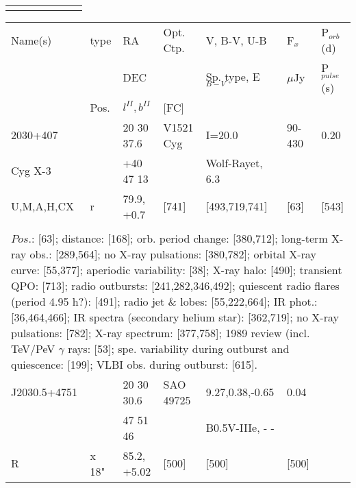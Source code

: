 \documentclass{aa}
\begin{document}
\begin{table*}[h]
\begin{tabular}{p{2.5cm}p{1cm}p{1.8cm}p{2.3cm}p{3.3cm}p{2.0cm}p{2.2cm}}
\noalign{\smallskip}
\hline
\end{tabular}
\end{table*}

\clearpage\begin{table*}[h]
\begin{tabular}{p{2.5cm}p{1cm}p{1.8cm}p{2.3cm}p{3.3cm}p{2.0cm}p{2.2cm}}
\noalign{\smallskip}
\multicolumn{7}{p{17.5cm}}{Table 1.  (continued) }\\        
\hline
\noalign{\smallskip}
Name(s)      & type  & RA                  &  Opt. Ctp. & V, B-V, U-B                    &   F$_{x}$           & P$_{orb}$(d)    \\
                      &            &  DEC              &                     &  Sp. type, E$_{B-V}$  &    $\mu$Jy        & P$_{pulse}$(s) \\
                      & Pos.  &  $l^{II}, b^{II}$     &  [FC]           &                                          &                            &                             \\
\noalign{\smallskip} 

\hline
\noalign{\smallskip}
2030+407     &           & 20 30 37.6       & V1521 Cyg         & I=20.0                       & 90-430             & 0.20          \\
Cyg X-3        &           & +40 47 13        &                               &  Wolf-Rayet, 6.3    &                          &                   \\
U,M,A,H,CX   & r        & 79.9, +0.7        & [741]                  &  [493,719,741]     & [63]                  & [543]         \\
\\
\multicolumn{7}{p{17.5cm}}{
$Pos$.: [63]; distance: [168]; orb. period change: [380,712]; long-term X-ray obs.: [289,564]; 
no X-ray pulsations: [380,782]; orbital X-ray curve: [55,377]; aperiodic variability: [38]; X-ray halo: [490];
transient QPO: [713]; radio outbursts: [241,282,346,492]; quiescent radio flares (period 4.95 h?): [491];
radio jet \& lobes: [55,222,664]; IR phot.: [36,464,466]; IR spectra (secondary helium star): [362,719];
no X-ray pulsations: [782]; X-ray spectrum: [377,758]; 1989 review (incl. TeV/PeV $\gamma$ rays: [53];
spe. variability during outburst and quiescence: [199]; VLBI obs. during outburst: [615].}\\

\noalign{\smallskip}
\hline
\noalign{\smallskip}
J2030.5+4751    &                & 20 30 30.6     & SAO 49725       &     9.27,0.38,-0.65      & 0.04        &  \\
                              &                & 47 51 46        &                             &  B0.5V-IIIe, - -            &                 &   \\
R                           &  x 18"    & 85.2, +5.02     &       [500]             &           [500]                &      [500]     &  \\
  

\end{tabular}
\end{table*}
\end{document}
